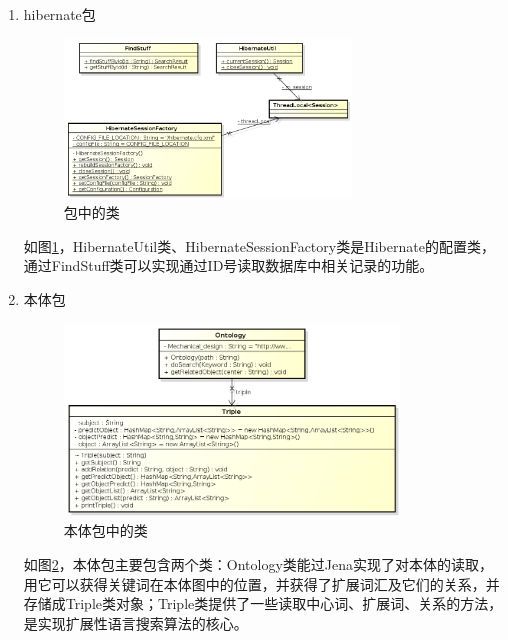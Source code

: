 \documentclass[12pt,a4paper]{article}
\newcommand{\wuhao}{\fontsize{10.5pt}{\baselineskip}\selectfont}
\begin{document}
\begin{enumerate}[(1)]
	{\Times MakeDBandIndex}类是建立索引和把文本添加进数据库的总入口；{\Times StuffTextFileProcessor}类是完成索引操作和数据库操作的核心类，由{\Times PropertyConfiguration}类为它提供相关的参数配置；然后，通过{\Times StuffJDBC}类实现与数据库的通信，通过{\Times StuffIndexer}类来建立索引；接下来用{\Times traverse()}方法遍历目标目录的每个文件，通过{\Times StuffDocument}类对每个文本的{\Times ID}、文件件、路径、内容等域进行索引操作，并把相应文件名和路径封装成{\Times Stuff}类，再把{\Times Stuff}类对象添加到数据库中。从而实现了索引器和数据库维护的部分操作。
	
	\item {\Times hibernate}包
	
	\begin{figure}[htbp] 
	\centering\includegraphics[width=3in]{fig/hibernatepackage.png} 
	\caption{\wuhao {\Times hibernate}包中的类}\label{fig:hibernate包}
	\end{figure}

	如图\ref{fig:hibernate包}，{\Times HibernateUtil}类、{\Times HibernateSessionFactory}类是{\Times Hibernate}的配置类，通过{\Times FindStuff}类可以实现通过{\Times ID}号读取数据库中相关记录的功能。
	
	\item 本体包
	
	\begin{figure}[htbp] 
	\centering\includegraphics[width=3.5in]{fig/OntologyPackage.png} 
	\caption{\wuhao 本体包中的类}\label{fig:ontology包}
	\end{figure}

	
	如图\ref{fig:ontology包}，本体包主要包含两个类：{\Times Ontology}类能过{\Times Jena}实现了对本体的读取，用它可以获得关键词在本体图中的位置，并获得了扩展词汇及它们的关系，并存储成{\Times Triple}类对象；{\Times Triple}类提供了一些读取中心词、扩展词、关系的方法，是实现扩展性语言搜索算法的核心。
	

\end{enumerate}
\end{document}
